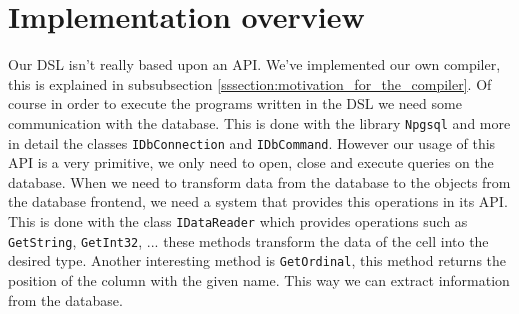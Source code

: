 
\section{Implementation overview}
Our DSL isn't really based upon an API. We've implemented our own compiler, this is explained in subsubsection \ref{sssection:motivation_for_the_compiler}. Of course in order to execute the programs written in the DSL we need some communication with the database. This is done with the library \texttt{Npgsql} and more in detail the classes \texttt{IDbConnection} and \texttt{IDbCommand}. However our usage of this API is a very primitive, we only need to open, close and execute queries on the database. When we need to transform data from the database to the objects from the database frontend, we need a system that provides this operations in its API. This is done with the class \texttt{IDataReader} which provides operations such as \texttt{GetString}, \texttt{GetInt32}, ... these methods transform the data of the cell into the desired type. Another interesting method is \texttt{GetOrdinal}, this method returns the position of the column with the given name. This way we can extract information from the database.